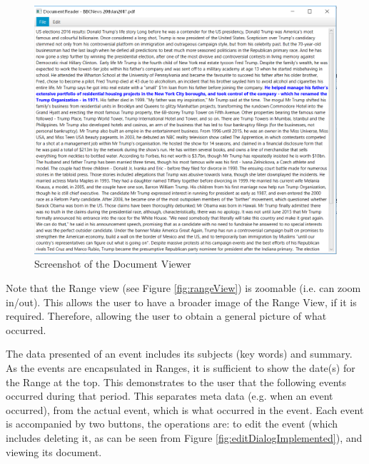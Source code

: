 \begin{figure}[h]
\caption{Screenshot of the Document Viewer}
\label{fig:viewDocImplemented}
\includegraphics[width=\linewidth]{viewDocImplemented.png}
\centering
\end{figure}

\par Note that the Range view (see Figure \ref{fig:rangeView}) is zoomable (i.e. can zoom in/out). This allows the user to have a broader image of the Range View, if it is required. Therefore, allowing the user to obtain a general picture of what occurred.

\par The data presented of an event includes its subjects (key words) and summary. As the events are encapsulated in Ranges, it is sufficient to show the date(s) for the Range at the top. This demonstrates to the user that the following events occurred during that period.  This separates meta data (e.g. when an event occurred), from the actual event, which is what occurred in the event. Each event is accompanied by two buttons, the operations are: to edit the event (which includes deleting it, as can be seen from Figure \ref{fig:editDialogImplemented}), and viewing its document.

